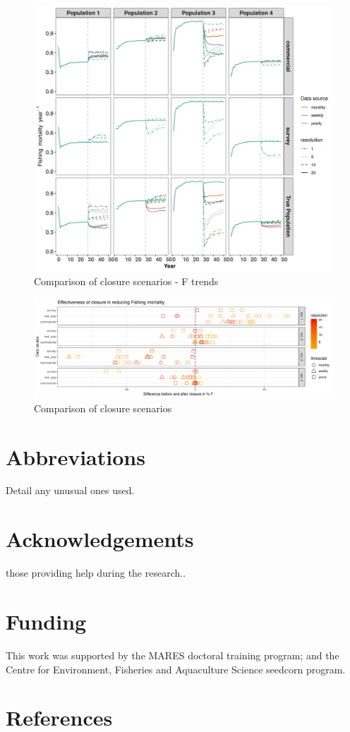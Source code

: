 \documentclass[review]{elsarticle}
\begin{document}
\begin{figure}[!ht]
	\includegraphics[width = \linewidth]{../analysis/F_trendsREV}
	\caption{Comparison of closure scenarios - F trends}
	\label{fig:3}
\end{figure}	

\begin{figure}[!ht]
	\includegraphics[width =\linewidth]{../analysis/Overview_plot_highPopRev}
	\caption{Comparison of closure scenarios}
	\label{fig:4}
\end{figure}	

\section*{Abbreviations} Detail any unusual ones used.

\section*{Acknowledgements} those providing help during the research..

\section*{Funding} This work was supported by the MARES doctoral training
program; and the Centre for Environment, Fisheries and Aquaculture Science
seedcorn program.

\clearpage

\section*{References}


\end{document}
